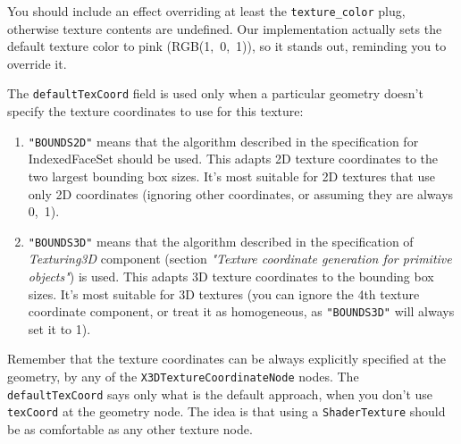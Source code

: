\documentclass{acmsiggraph}                     %
\newenvironment{myenumerate}
{\begin{enumerate}
  \setlength{\itemsep}{0pt}
  \setlength{\parskip}{0pt}
  \setlength{\parsep}{0pt}}
{\end{enumerate}}
\begin{document}
You should include an effect overriding at least the \texttt{texture\_color}
plug, otherwise texture contents are undefined. Our implementation actually
sets the default texture color to pink (RGB(1,~0,~1)), so it stands out,
reminding you to override it.

The \texttt{defaultTexCoord} field is used only when a particular geometry
doesn't specify the texture coordinates to use for this texture:

\begin{myenumerate}

\item
  \texttt{"BOUNDS2D"} means that the algorithm described in the specification
  for {IndexedFaceSet} should be used. This adapts 2D texture coordinates
  to the two largest bounding box sizes.
  It's most suitable for 2D textures that use only 2D coordinates
  (ignoring other coordinates, or assuming they are always 0,~1).

\item
  \texttt{"BOUNDS3D"} means that the algorithm described in the specification
  of \textit{Texturing3D} component (section \textit{"Texture coordinate generation for primitive objects"})
  is used.
  This adapts 3D texture coordinates to the bounding box sizes.
  It's most suitable for 3D textures (you can ignore the 4th texture coordinate
  component, or treat it as homogeneous, as \texttt{"BOUNDS3D"} will always
  set it to 1).

\end{myenumerate}

Remember that the texture coordinates can be always explicitly specified
at the geometry, by any of the \texttt{X3DTextureCoordinateNode} nodes.
The \texttt{defaultTexCoord} says only what is the default approach,
when you don't use \texttt{texCoord} at the geometry node.
The idea is that using a \texttt{ShaderTexture} should be as comfortable
as any other texture node.

\end{document}
